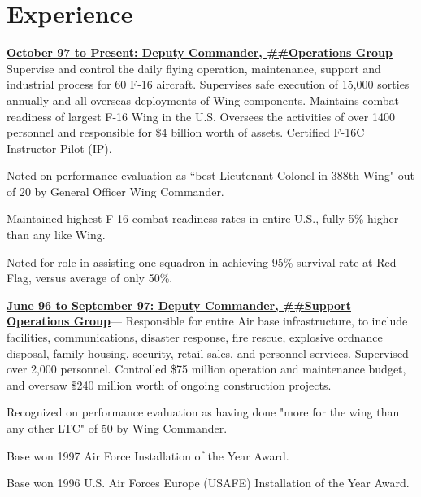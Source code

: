 \documentclass[10pt,letterpaper]{article}
\newenvironment{accomplishments}{%
	\begin{list}{\textbullet}{%
        \setlength\leftmargin{1em}      %
        \setlength\topsep{0ex}          %
        \setlength\parskip{0.5ex}
        \setstretch{0.8}
        \setlength\listparindent{1em}   %
        \setlength\parsep{0in}          %
        \setlength\itemsep{0.5ex}         %
        }
}{
	\end{list}
}
\newcommand{\accomplishment}{\item }
\newenvironment{job}[4]{%
\vspace{0.0em}
\noindent\textbf{\underline{{#1: #2\ifthenelse{\isempty{#3}}{}{, #3}}}}---#4%
\noindent\begin{accomplishments}{}
}{
\end{accomplishments}
\vspace{1.5em}
}
\begin{document}
\maketitle

\section*{Experience}

\begin{job}{October 97 to Present}{Deputy Commander, \#\#Operations Group}{USAFB}{%
Supervise and control the daily flying operation,
maintenance, support and industrial process for 60 F-16 aircraft. Supervises safe execution of 15,000 sorties annually and all overseas
deployments of Wing components. Maintains combat readiness of largest F-16 Wing in the U.S. Oversees the activities of over 1400
personnel and responsible for \$4 billion worth of assets. Certified F-16C Instructor Pilot (IP).
}
\accomplishment Noted on performance evaluation as ``best Lieutenant Colonel in 388th Wing" out of 20 by General Officer Wing Commander.
\accomplishment Maintained highest F-16 combat readiness rates in entire U.S., fully 5\% higher than any like Wing.
\accomplishment Noted for role in assisting one squadron in achieving 95\% survival rate at Red Flag, versus average of only 50\%.
\end{job}

\begin{job}{June 96 to September 97}{Deputy Commander, \#\#Support Operations Group}{USAB}{%
Responsible for entire Air base infrastructure, to include facilities, communications, disaster response, fire rescue, explosive ordnance disposal, family housing,
security, retail sales, and personnel services. Supervised over 2,000 personnel. Controlled \$75 million operation and maintenance
budget, and oversaw \$240 million worth of ongoing construction projects.
}
\accomplishment Recognized on performance evaluation as having done "more for the wing than any other LTC" of 50 by Wing Commander.
\accomplishment Base won 1997 Air Force Installation of the Year Award.
\accomplishment Base won 1996 U.S. Air Forces Europe (USAFE) Installation of the Year Award.
\end{job}
\end{document}
